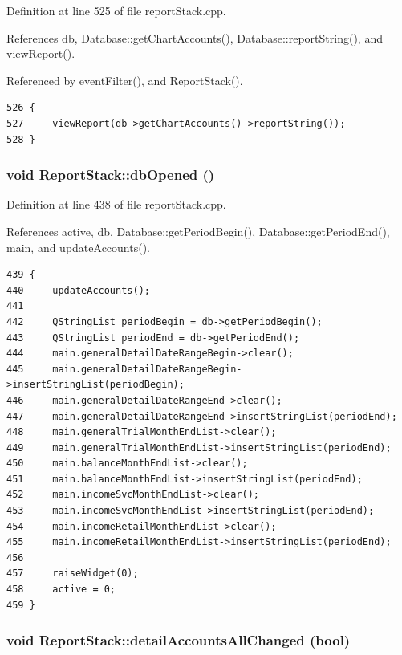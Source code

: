 Definition at line 525 of file report\-Stack.cpp.

References db, Database::get\-Chart\-Accounts(), Database::report\-String(), and view\-Report().

Referenced by event\-Filter(), and Report\-Stack().

\footnotesize\begin{verbatim}526 {
527     viewReport(db->getChartAccounts()->reportString());
528 }
\end{verbatim}\normalsize 


\hypertarget{classReportStack_k2}{
\subsubsection[dbOpened]{\setlength{\rightskip}{0pt plus 5cm}void Report\-Stack::db\-Opened ()}}
\label{classReportStack_k2}


Definition at line 438 of file report\-Stack.cpp.

References active, db, Database::get\-Period\-Begin(), Database::get\-Period\-End(), main, and update\-Accounts().

\footnotesize\begin{verbatim}439 {
440     updateAccounts();
441     
442     QStringList periodBegin = db->getPeriodBegin();
443     QStringList periodEnd = db->getPeriodEnd();
444     main.generalDetailDateRangeBegin->clear();
445     main.generalDetailDateRangeBegin->insertStringList(periodBegin);
446     main.generalDetailDateRangeEnd->clear();
447     main.generalDetailDateRangeEnd->insertStringList(periodEnd);
448     main.generalTrialMonthEndList->clear();
449     main.generalTrialMonthEndList->insertStringList(periodEnd);
450     main.balanceMonthEndList->clear();
451     main.balanceMonthEndList->insertStringList(periodEnd);
452     main.incomeSvcMonthEndList->clear();
453     main.incomeSvcMonthEndList->insertStringList(periodEnd);
454     main.incomeRetailMonthEndList->clear();
455     main.incomeRetailMonthEndList->insertStringList(periodEnd);
456 
457     raiseWidget(0);
458     active = 0;
459 }
\end{verbatim}\normalsize 


\hypertarget{classReportStack_k0}{
\subsubsection[detailAccountsAllChanged]{\setlength{\rightskip}{0pt plus 5cm}void Report\-Stack::detail\-Accounts\-All\-Changed (bool)}}
\label{classReportStack_k0}


